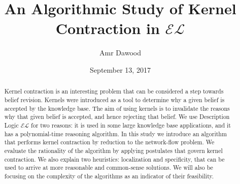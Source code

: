 \documentclass{sfuthesis}
\title{An Algorithmic Study of Kernel Contraction in $\mathcal{EL}$}
\author{Amr Dawood}
\date{September 13, 2017}
\theoremstyle{plain}
\theoremstyle{definition}
\begin{document}
\frontmatter
\maketitle{}
\makecommittee{}

\begin{abstract}
Kernel contraction is an interesting problem that can be considered a step towards belief revision. Kernels were introduced as a tool to determine why a given belief is accepted by the knowledge base. The aim of using kernels is to invalidate the reasons why that given belief is accepted, and hence rejecting that belief. We use Description Logic $\mathcal{EL}$ for two reasons: it is used in some large knowledge base applications, and it has a polynomial-time reasoning algorithm. In this study we introduce an algorithm that performs kernel contraction by reduction to the network-flow problem. We evaluate the rationality of the algorithm by applying postulates that govern kernel contraction. We also explain two heuristics: localization and specificity, that can be used to arrive at more reasonable and common-sense solutions. We will also be focusing on the complexity of the algorithms as an indicator of their feasibility.
\end{abstract}


%
%

\tableofcontents\clearpage
{}\listoffigures





%
%

\mainmatter%
















\end{document}
